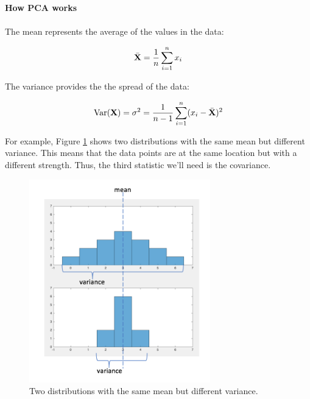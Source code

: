 \documentclass[11pt, oneside]{article}   	%
\begin{document}
\paragraph{How PCA works}
\paragraph{}

The mean represents the average of the values in the data:

\begin{equation}
   \bar{{\bf X}} = \frac{1}{n} \sum_{i=1}^{n} x_i 
\end{equation}

The variance provides the the spread of the data:

\begin{equation}
   \text{Var} ({\bf X}) = \sigma^2  = \frac{1}{n-1} \sum_{i=1}^{n} ( x_i -  \bar{{\bf X}})^2
\end{equation}


For example, Figure \ref{fig:MeanVariance} shows two distributions with the same mean but different variance. This means that the data points are at the same location but with a different strength. Thus, the third statistic we'll need is the covariance.

\begin{figure}[!ht]
	\centering
	\includegraphics[width=0.7\textwidth]{same-mean_different-variance}
	\caption{Two distributions with the same mean but different variance.}
	\label{fig:MeanVariance}
\end{figure}
\end{document}
